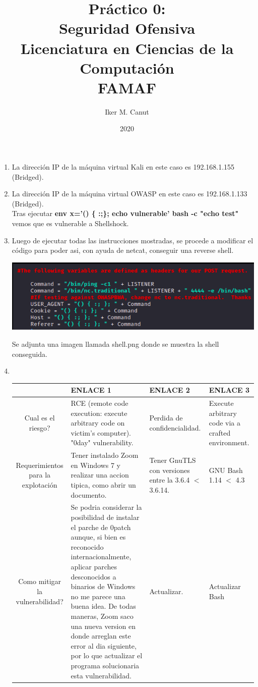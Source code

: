 \documentclass[11pt,a4paper]{article}
\author{Iker M. Canut}
\title{Pr\'actico 0: \\ Seguridad Ofensiva\\Licenciatura en Ciencias de la Computaci\'on\\ FAMAF}
\date{2020}
\begin{document}
\maketitle
\newpage

\begin{enumerate}

\item La direcci\'on IP de la m\'aquina virtual Kali en este caso es 192.168.1.155 (Bridged).
\item La direcci\'on IP de la m\'aquina virtual OWASP en este caso es 192.168.1.133 (Bridged).\\
Tras ejecutar \textbf{env x='() \{ :;\}; echo vulnerable' bash -c "echo test"} vemos que es vulnerable a Shellshock.
\item Luego de ejecutar todas las instrucciones mostradas, se procede a modificar el c\'odigo para poder asi, con ayuda de netcat, conseguir una reverse shell.
\begin{center}
\includegraphics[scale=.6]{codigo.png}\\
\end{center}
Se adjunta una imagen llamada shell.png donde se muestra la shell conseguida.


\item $\ \ $
\begin{table}[h]
\begin{center}
\begin{tabular}{|S|L|M|M|}
\hline
& ENLACE 1 & ENLACE 2 & ENLACE 3\\
\hline
Cual es el riesgo? & RCE (remote code execution: execute arbitrary code on victim's computer). "0day" vulnerability. & Perdida de confidencialidad. &  Execute arbitrary code via a crafted environment.\\
\hline
Requerimientos para la explotaci\'on & Tener instalado Zoom en Windows 7 y realizar una accion tipica, como abrir un documento. & Tener GnuTLS con versiones entre la 3.6.4 $<$ 3.6.14. & GNU Bash 1.14 $<$ 4.3\\
\hline
Como mitigar la vulnerabilidad? & Se podria considerar la posibilidad de instalar el parche de 0patch aunque, si bien es reconocido internacionalmente, aplicar parches desconocidos a binarios de Windows no me parece una buena idea. De todas maneras, Zoom saco una nueva version en donde arreglan este error al dia siguiente, por lo que actualizar el programa solucionaria esta vulnerabilidad. & Actualizar. & Actualizar Bash\\
\hline
\end{tabular}
\end{center}
\end{table}


\end{enumerate}
\end{document}
